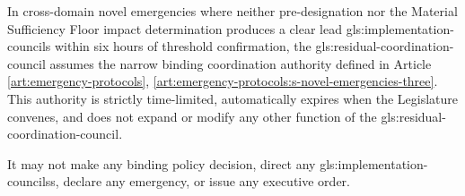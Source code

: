 In cross-domain novel emergencies where neither pre-designation nor the Material Sufficiency Floor impact determination produces a clear lead \gls{gls:implementation-councils} within six hours of threshold confirmation, the \gls{gls:residual-coordination-council} assumes the narrow binding coordination authority defined in Article \ref{art:emergency-protocols}, \ref{art:emergency-protocols:s-novel-emergencies-three}. This authority is strictly time-limited, automatically expires when the Legislature convenes, and does not expand or modify any other function of the \gls{gls:residual-coordination-council}.

It may not make any binding policy decision, direct any \gls{gls:implementation-councils}s, declare any emergency, or issue any executive order.